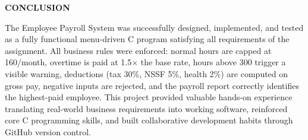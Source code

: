\documentclass[
]{article}
\begin{document}
\textbf{CONCLUSION}

The Employee Payroll System was successfully designed, implemented, and
tested as a fully functional menu-driven C program satisfying all
requirements of the assignment. All business rules were enforced: normal
hours are capped at 160/month, overtime is paid at 1.5× the base rate,
hours above 300 trigger a visible warning, deductions (tax 30\%, NSSF
5\%, health 2\%) are computed on gross pay, negative inputs are
rejected, and the payroll report correctly identifies the highest-paid
employee. This project provided valuable hands-on experience translating
real-world business requirements into working software, reinforced core
C programming skills, and built collaborative development habits through
GitHub version control.
\end{document}
